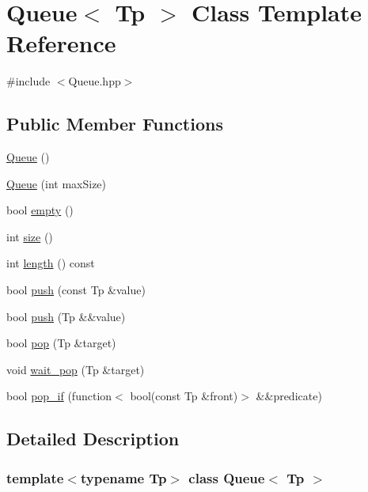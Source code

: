 \hypertarget{classQueue}{}\section{Queue$<$ Tp $>$ Class Template Reference}
\label{classQueue}


{\ttfamily \#include $<$Queue.\+hpp$>$}

\subsection*{Public Member Functions}
\begin{DoxyCompactItemize}
\item 
\mbox{\hyperlink{classQueue_a71a0de9bb1e4bf3f36f3ed033398eeff}{Queue}} ()
\item 
\mbox{\hyperlink{classQueue_a9c828c8a0b58c579eaa0279b9ebfe2f1}{Queue}} (int max\+Size)
\item 
bool \mbox{\hyperlink{classQueue_af332726c4f0882923eb8c1466d6f7b2c}{empty}} ()
\item 
int \mbox{\hyperlink{classQueue_a87514f47ccd19ce0ae845503d7627c5d}{size}} ()
\item 
int \mbox{\hyperlink{classQueue_a481598ed9c07d23c00ce3648c148415d}{length}} () const
\item 
bool \mbox{\hyperlink{classQueue_a01d580b06f7fc95a3b8292b598405507}{push}} (const Tp \&value)
\item 
bool \mbox{\hyperlink{classQueue_a372de387e3016b225798697ac2c18401}{push}} (Tp \&\&value)
\item 
bool \mbox{\hyperlink{classQueue_aac66ef3af1e47ec1ccd3dea60e40fd7c}{pop}} (Tp \&target)
\item 
void \mbox{\hyperlink{classQueue_a0fdf9ec322669edbd88225b370587cf7}{wait\+\_\+pop}} (Tp \&target)
\item 
bool \mbox{\hyperlink{classQueue_a919fd45266827995c68caedde29e0962}{pop\+\_\+if}} (function$<$ bool(const Tp \&front)$>$ \&\&predicate)
\end{DoxyCompactItemize}


\subsection{Detailed Description}
\subsubsection*{template$<$typename Tp$>$\newline
class Queue$<$ Tp $>$}

